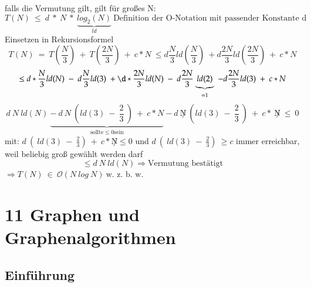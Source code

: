 \documentclass[11pt, fleqn]{scrreprt}
\begin{document}
\begin{itemize}
		falls die Vermutung gilt, gilt für großes N:
		\[ T(N)\ \leq\ d\ *\ N\ *\ \underbrace{log_2(N)}_{ld}\ \text{Definition der O-Notation mit passender Konstante d}\]
		Einsetzen in Rekursionsformel
		\[ T(N)\ =\ T\left(\frac{N}{3}\right)\ +\ T\left(\frac{2N}{3}\right)\ +\ c*N \ \leq d \frac{N}{3} ld\left(\frac{N}{3}\right)\ + d\frac{2N}{3} ld\left(\frac{2N}{3}\right)\ +\ c*N\]
		\[ \leq d*\frac{N}{3} ld(N)\ -\ d\frac{N}{3} ld(3)\ +\d*\frac{2N}{3} ld(N)\ -\ d\frac{2N}{3} \underbrace{ld(2)}_{=1}\ - d\frac{2N}{3} ld(3)\ +\ c*N \]
		\[ d\ N\ ld(N)\ \underbrace{-\ d\ N\ \left(ld(3)\ -\ \frac{2}{3}\ \right)\ +\ c*N}_{\text{sollte} \leq 0\text{sein}} - d\ \not N\  \left(ld(3)\ - \ \frac{2}{3}\ \right)\ +\ c*\ \not N\ \leq\ 0\]
		mit: 
		\hspace*{1cm} $d\ \left(\ ld(3)\ -\ \frac{2}{3}\right)\ +\ c* \not N \leq 0$ und $d\ \left(\ ld(3)\ -\ \frac{2}{3}\right)\ \geq c$ immer erreichbar, weil beliebig groß gewählt werden darf
		\[ \leq d\ N\ ld(N) \Rightarrow \text{Vermutung bestätigt}\]
		$\Rightarrow T(N)\ \in\ \mathcal{O}(N\ log\ N)\  \text{w. z. b. w.}$
	\end{itemize}
	

\chapter*{11 Graphen und Graphenalgorithmen}
\section*{Einführung}
\end{document}

